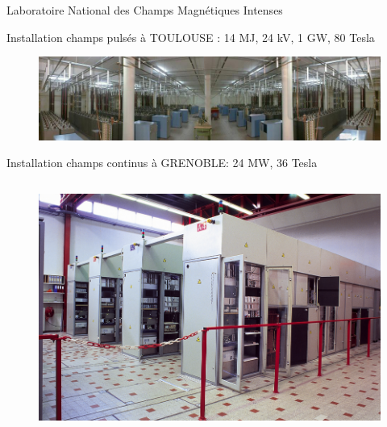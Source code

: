 \begin{frame}{Laboratoire National des Champs Magn\'etiques Intenses}

   Installation champs pulsés à TOULOUSE : 14 MJ, 24 kV, 1 GW, 80 Tesla
   \vskip-0.3cm
   \begin{figure}[H]
    \centering
    \includegraphics[scale=0.3]{Figures/cmi/powersupply_pulsed.png}
   \end{figure}

   Installation champs continus à GRENOBLE: 24 MW,  36 Tesla
   \vskip-0.3cm

 \begin{columns}[c]
  \begin{column}{8cm}
   \begin{figure}[H]
    \centering
    \includegraphics[scale=0.2]{Figures/cmi/powersupply.png}
   \end{figure}
  \end{column}


\end{columns}
\end{frame}
